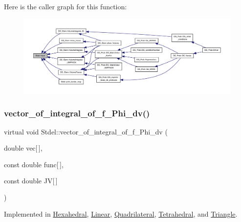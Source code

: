 Here is the caller graph for this function\+:
\nopagebreak
\begin{figure}[H]
\begin{center}
\leavevmode
\includegraphics[width=350pt]{classStdel_aeb2fe03bbd8af61e503e29d3dd5ae4f0_icgraph}
\end{center}
\end{figure}
\mbox{\label{classStdel_aa5ef347c02106753c2d3961b59a7309e}} 
\subsubsection{\texorpdfstring{vector\+\_\+of\+\_\+integral\+\_\+of\+\_\+f\+\_\+\+Phi\+\_\+dv()}{vector\_of\_integral\_of\_f\_Phi\_dv()}\hspace{0.1cm}{\footnotesize\ttfamily [1/2]}}
{\footnotesize\ttfamily virtual void Stdel\+::vector\+\_\+of\+\_\+integral\+\_\+of\+\_\+f\+\_\+\+Phi\+\_\+dv (\begin{DoxyParamCaption}\item[{double}]{vec\mbox{[}$\,$\mbox{]},  }\item[{const double}]{func\mbox{[}$\,$\mbox{]},  }\item[{const double}]{JV\mbox{[}$\,$\mbox{]} }\end{DoxyParamCaption})\hspace{0.3cm}{\ttfamily [pure virtual]}}



Implemented in \hyperlink{classHexahedral_a22d3f788ce0bdf8209c800282868b8c1}{Hexahedral}, \hyperlink{classLinear_a5068b12a277108b085b000b4ace97d45}{Linear}, \hyperlink{classQuadrilateral_a8ef93eed8fa22ae11f3736fe3b255038}{Quadrilateral}, \hyperlink{classTetrahedral_aff4e988560d3b0206b95d13d6b7e795b}{Tetrahedral}, and \hyperlink{classTriangle_afc023a739048c1294b8417bfec3afb7a}{Triangle}.



